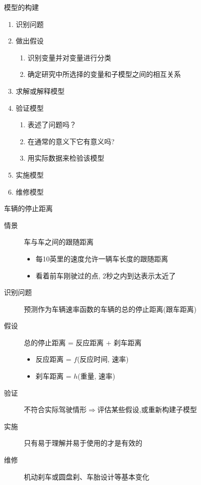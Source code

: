 \documentclass[UTF8]{ctexbeamer}
\begin{document}
\begin{frame}{模型的构建}

  \begin{enumerate}
  \item 识别问题
  \item 做出假设
    \begin{enumerate}
    \item 识别变量并对变量进行分类
    \item 确定研究中所选择的变量和子模型之间的相互关系
    \end{enumerate}
  \item 求解或解释模型
  \item 验证模型
    \begin{enumerate}
    \item 表述了问题吗？
    \item 在通常的意义下它有意义吗?
    \item 用实际数据来检验该模型
    \end{enumerate}
  \item 实施模型
  \item 维修模型
  \end{enumerate}
  
\end{frame}

\begin{frame}{车辆的停止距离}

  \begin{description}
  \item[情景] 车与车之间的跟随距离
    \begin{itemize}
    \item 每10英里的速度允许一辆车长度的跟随距离
    \item 看着前车刚驶过的点, 2秒之内到达表示太近了
    \end{itemize}
  \item[识别问题] 预测作为车辆速率函数的车辆的总的停止距离(跟车距离)
  \item[假设] 总的停止距离 = 反应距离 + 刹车距离
    \begin{itemize}
    \item 反应距离 = $f$(反应时间, 速率)
    \item 刹车距离 = $h$(重量, 速率)
    \end{itemize}
  \item[验证] 不符合实际驾驶情形$\Rightarrow$评估某些假设,或重新构建子模型
  \item[实施] 只有易于理解并易于使用的才是有效的
  \item[维修] 机动刹车或圆盘刹、车胎设计等基本变化
  \end{description}
  
\end{frame}
\end{document}
